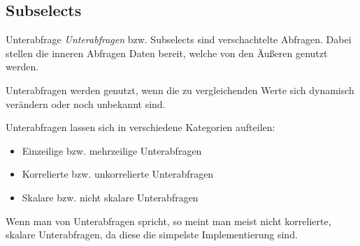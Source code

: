 \subsection{Subselects}

\begin{defi}{Unterabfrage}
    \emph{Unterabfragen} bzw. Subselects sind verschachtelte Abfragen.
    Dabei stellen die inneren Abfragen Daten bereit, welche von den Äußeren genutzt werden.

    Unterabfragen werden genutzt, wenn die zu vergleichenden Werte sich dynamisch verändern oder noch unbekannt sind.

    Unterabfragen lassen sich in verschiedene Kategorien aufteilen:

    \begin{itemize}
        \item Einzeilige bzw. mehrzeilige Unterabfragen
        \item Korrelierte bzw. unkorrelierte Unterabfragen
        \item Skalare bzw. nicht skalare Unterabfragen
    \end{itemize}

    Wenn man von Unterabfragen spricht, so meint man meist nicht korrelierte, skalare Unterabfragen, da diese die simpelste Implementierung sind.
\end{defi}

